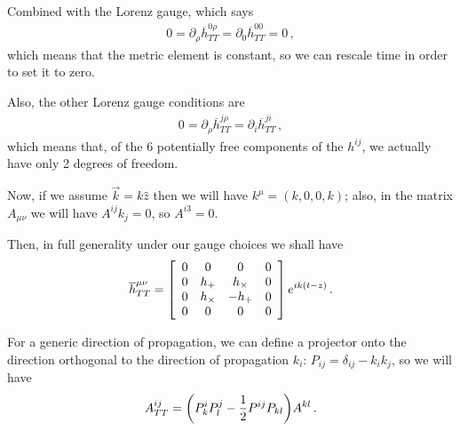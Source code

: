 \documentclass[main.tex]{subfiles}
\begin{document}
Combined with the Lorenz gauge, which says 
%
\begin{align}
0= \partial_{\rho } \overline{h}^{0 \rho }_{TT} = \partial_{0} \overline{h}^{00}_{TT} = 0
\,,
\end{align}
%
which means that the metric element is constant, so we can rescale time in order to set it to zero. 

Also, the other Lorenz gauge conditions are 
%
\begin{align}
0= \partial_{\rho } \overline{h}^{j \rho }_{TT} = \partial_{i} \overline{h}^{ji}_{TT}
\,,
\end{align}
%
which means that, of the 6 potentially free components of the \(h^{ij}\), we actually have only 2 degrees of freedom.

Now, if we assume \(\vec{k} = k \hat{z}\) then we will have \(k^{\mu } = (k, 0, 0, k)\); also, in the matrix \(A_{\mu \nu }\) we will have \(A^{ij}k_{j} = 0\), so \(A^{i3}=0\). 

Then, in full generality under our gauge choices we shall have 
%
\begin{subequations}
\begin{align}
\overline{h}^{\mu \nu }_{TT} = \left[\begin{array}{cccc}
0 & 0 & 0 & 0 \\ 
0 & h_{+} & h_{ \times } & 0 \\ 
0 & h_{ \times } & - h_{+} & 0 \\ 
0 & 0 & 0 & 0
\end{array}\right]
e^{i k \qty(t -z)}
\,.
\end{align}
\end{subequations}

For a generic direction of propagation, we can define a projector onto the direction orthogonal to the direction of propagation \(k_{i}\): \(P_{ij} = \delta_{ij} - k_i k_j\), so we will have 
%
\begin{align}
A^{ij}_{TT} = \qty(P^{i}_{k} P^{j}_{l} - \frac{1}{2} P^{ij} P_{kl})A^{kl}
\,.
\end{align}
\end{document}
